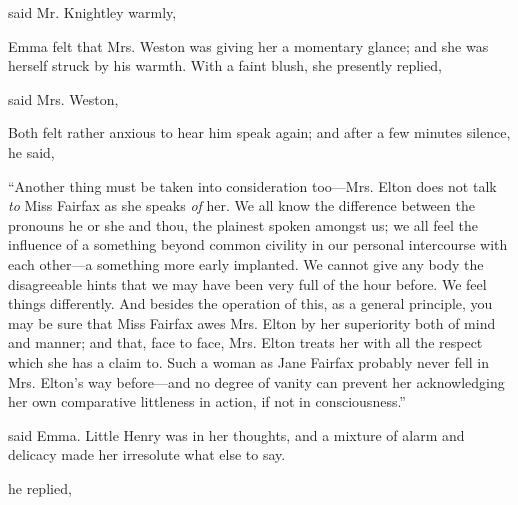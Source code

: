  said Mr. Knightley warmly, 

Emma felt that Mrs. Weston was giving her a momentary glance; and she was herself struck by his warmth. With a faint blush, she presently replied,


 said Mrs. Weston, 

Both felt rather anxious to hear him speak again; and after a few minutes silence, he said,

“Another thing must be taken into consideration too---Mrs. Elton does not talk {\em to} Miss Fairfax as she speaks {\em of} her. We all know the difference between the pronouns he or she and thou, the plainest spoken amongst us; we all feel the influence of a something beyond common civility in our personal intercourse with each other---a something more early implanted. We cannot give any body the disagreeable hints that we may have been very full of the hour before. We feel things differently. And besides the operation of this, as a general principle, you may be sure that Miss Fairfax awes Mrs. Elton by her superiority both of mind and manner; and that, face to face, Mrs. Elton treats her with all the respect which she has a claim to. Such a woman as Jane Fairfax probably never fell in Mrs. Elton's way before---and no degree of vanity can prevent her acknowledging her own comparative littleness in action, if not in consciousness.”

 said Emma. Little Henry was in her thoughts, and a mixture of alarm and delicacy made her irresolute what else to say.

 he replied, 

